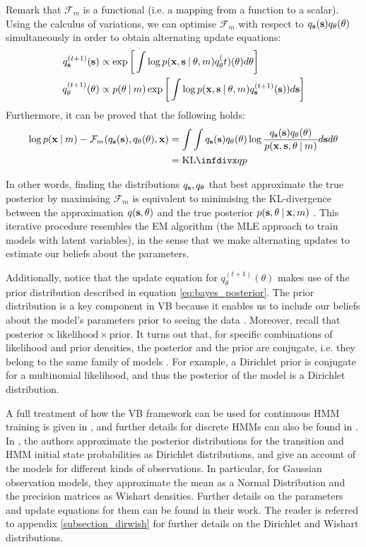 \documentclass[../main.tex]{subfiles}
\begin{document}
Remark that $\mathcal{F}_m$ is a functional (i.e. a mapping from a function to a scalar). Using the calculus of variations, we can optimise $\mathcal{F}_m$ with respect to $q_{\mathbf{s}}(\mathbf{s})q_{\theta}(\theta)$ simultaneously in order to obtain alternating update equations:
\begin{align*}
q_{\mathbf{s}}^{(t+1)}(\mathbf{s}) &\propto \exp{ \bigg[ \int \log{p(\mathbf{x}, \mathbf{s} \:\vert\: \theta, m)} q_\theta^(t)(\theta) d\theta \bigg] } \\
q_{\theta}^{(t+1)}(\theta) &\propto p(\theta \:\vert\: m) \exp{\bigg[ \int \log{p(\mathbf{x}, \mathbf{s} \:\vert\: \theta, m)} q_{\mathbf{s}}^{(t+1)}(\mathbf{s}))d\mathbf{s} \bigg]}
\end{align*}
Furthermore, it can be proved that the following holds:
\begin{align*}
\log{p(\V{x} \given m)} - \mathcal{F}_m(q_{\V{s}}(\V{s}), q_{\theta}(\theta), \V{x}) &= \int\int q_{\V{s}}(\V{s})q_{\theta}(\theta)\log{\frac{q_{\V{s}}(\V{s})q_{\theta}(\theta)}{p(\V{x}, \V{s}, \theta \given m)}} d\V{s} d\theta\\ &= \text{KL}\infdiv{q}{p}
\end{align*}
\par In other words, finding the distributions $q_{\mathbf{s}}, q_\theta$ that best approximate the true posterior by maximising $\mathcal{F}_m$ is equivalent to minimising the KL-divergence between the approximation $q(\mathbf{s}, \theta)$ and the true posterior $p(\mathbf{s}, \theta \:\vert\: \mathbf{x}, m)$ \cite{Ghahramani2003}. This iterative procedure resembles the EM algorithm (the MLE approach to train models with latent variables), in the sense that we make alternating updates to estimate our beliefs about the parameters.
\par Additionally, notice that the update equation for $q_{\theta}^{(t+1)}(\theta)$ makes use of the prior distribution described in equation \ref{eq:bayes_posterior}. The prior distribution is a key component in VB because it enables us to include our beliefs about the model's parameters prior to seeing the data \cite{Genovese2004}. Moreover, recall that $\text{posterior} \propto \text{likelihood} \times \text{prior}$. It turns out that, for specific combinations of likelihood and prior densities, the posterior and the prior are conjugate, i.e. they belong to the same family of models \cite{Rezek2005}. For example, a Dirichlet prior is conjugate for a multinomial likelihood, and thus the posterior of the model is a Dirichlet distribution. 
\par A full treatment of how the VB framework can be used for continuous HMM training is given in \cite{Rezek2005}, and further details for discrete HMMs can also be found in \cite{Beal2001,MacKay1997}. In \cite{Rezek2005}, the authors approximate the posterior distributions for the transition and HMM initial state probabilities as Dirichlet distributions, and give an account of the models for different kinds of observations. In particular, for Gaussian observation models, they approximate the mean as a Normal Distribution and the precision matrices as Wishart densities. Further details on the parameters and update equations for them can be found in their work. The reader is referred to appendix \ref{subsection_dirwish} for further details on the Dirichlet and Wishart distributions.
\end{document}
